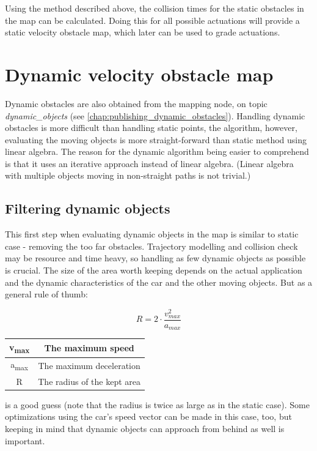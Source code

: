 Using the method described above, the collision times for the static obstacles in the map can be calculated. Doing this for all possible actuations will provide a static velocity obstacle map, which later can be used to grade actuations.

\section{Dynamic velocity obstacle map}
\label{chap:dynamic_velocity_obstacle_map}
Dynamic obstacles are also obtained from the mapping node, on topic \textit{dynamic\_objects} (see \ref{chap:publishing_dynamic_obstacles}).
Handling dynamic obstacles is more difficult than handling static points, the algorithm, however, evaluating the moving objects is more straight-forward than static method using linear algebra. The reason for the dynamic algorithm being easier to comprehend is that it uses an iterative approach instead of linear algebra. (Linear algebra with multiple objects moving in non-straight paths is not trivial.)

\subsection{Filtering dynamic objects}
This first step when evaluating dynamic objects in the map is similar to static case - removing the too far obstacles. Trajectory modelling and collision check may be  resource and time heavy, so handling as few dynamic objects as possible is crucial. The size of the area worth keeping depends on the actual application and the dynamic characteristics of the car and the other moving objects. But as a general rule of thumb:

\[ R = 2 \cdot \frac{v_{max}^2}{a_{max}} \]

\begin{center}
    \begin{tabular}{ | c | c | }
        \hline
        v\textsubscript{max}	& The maximum speed    			\\
        \hline
        a\textsubscript{max}  	& The maximum deceleration      \\
        \hline
        R  						& The radius of the kept area	\\
        \hline
    \end{tabular}
\end{center}

is a good guess (note that the radius is twice as large as in the static case). Some optimizations using the car's speed vector can be made in this case, too, but keeping in mind that dynamic objects can approach from behind as well is important.

